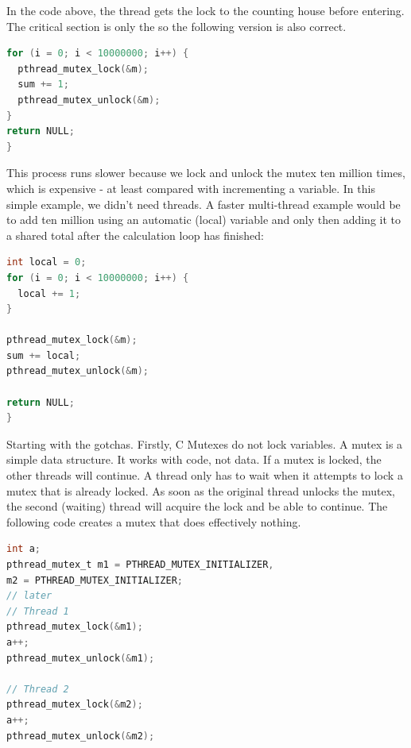 In the code above, the thread gets the lock to the counting house before entering.
The critical section is only the  so the following version is also correct.

\begin{lstlisting}[language=C]
for (i = 0; i < 10000000; i++) {
  pthread_mutex_lock(&m);
  sum += 1;
  pthread_mutex_unlock(&m);
}
return NULL;
}
\end{lstlisting}

This process runs slower because we lock and unlock the mutex ten million times, which is expensive - at least compared with incrementing a variable.
In this simple example, we didn't need threads.
A faster multi-thread example would be to add ten million using an automatic (local) variable and only then adding it to a shared total after the calculation loop has finished:

\begin{lstlisting}[language=C]
int local = 0;
for (i = 0; i < 10000000; i++) {
  local += 1;
}

pthread_mutex_lock(&m);
sum += local;
pthread_mutex_unlock(&m);

return NULL;
}
\end{lstlisting}


Starting with the gotchas.
Firstly, C Mutexes do not lock variables.
A mutex is a simple data structure.
It works with code, not data.
If a mutex is locked, the other threads will continue.
A thread only has to wait when it attempts to lock a mutex that is already locked.
As soon as the original thread unlocks the mutex, the second (waiting) thread will acquire the lock and be able to continue.
The following code creates a mutex that does effectively nothing.

\begin{lstlisting}[language=C]
int a;
pthread_mutex_t m1 = PTHREAD_MUTEX_INITIALIZER,
m2 = PTHREAD_MUTEX_INITIALIZER;
// later
// Thread 1
pthread_mutex_lock(&m1);
a++;
pthread_mutex_unlock(&m1);

// Thread 2
pthread_mutex_lock(&m2);
a++;
pthread_mutex_unlock(&m2);
\end{lstlisting}

